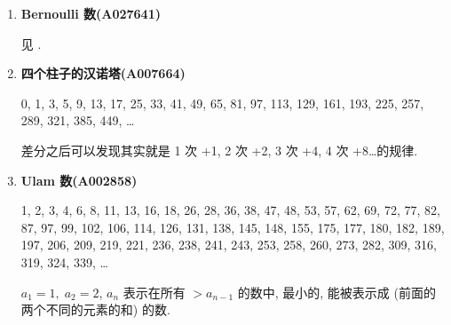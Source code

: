\begin{enumerate}
    \item \textbf{Bernoulli 数(A027641)}
          
          见 .
          
    \item \textbf{四个柱子的汉诺塔(A007664)}
          
          0, 1, 3, 5, 9, 13, 17, 25, 33, 41, 49, 65, 81, 97, 113, 129, 161, 193, 225, 257, 289, 321, 385, 449, \dots
          
          差分之后可以发现其实就是 1 次 +1, 2 次 +2, 3 次 +4, 4 次 +8\dots 的规律.
          
    \item \textbf{Ulam 数(A002858)}
          
          1, 2, 3, 4, 6, 8, 11, 13, 16, 18, 26, 28, 36, 38, 47, 48, 53, 57, 62, 69, 72, 77, 82, 87, 97, 99, 102, 106, 114, 126, 131, 138, 145, 148, 155, 175, 177, 180, 182, 189, 197, 206, 209, 219, 221, 236, 238, 241, 243, 253, 258, 260, 273, 282, 309, 316, 319, 324, 339, \dots
          
          \( a_1 = 1,\; a_2 = 2 \), \(a_n\) 表示在所有 \(>a_{n-1}\) 的数中, 最小的, 能被表示成 (前面的两个不同的元素的和) 的数.
\end{enumerate}
